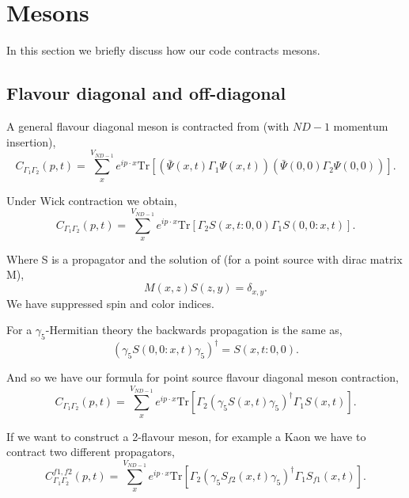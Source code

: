 \section{Mesons}

In this section we briefly discuss how our code contracts mesons.

\subsection{Flavour diagonal and off-diagonal}

A general flavour diagonal meson is contracted from (with $ND-1$ 
momentum insertion),
\begin{equation}
C_{\Gamma_1\Gamma_2}(p,t)=\sum_{x}^{V_{ND-1}}e^{ip\cdot x}\text{Tr}
\left[\left(\bar{\Psi}(x,t)\Gamma_1 \Psi(x,t)\right) 
\left(\bar{\Psi}(0,0)\Gamma_2 \Psi(0,0)\right)\right].
\end{equation}

Under Wick contraction we obtain,
\begin{equation}
C_{\Gamma_1\Gamma_2}(p,t)=\sum_{x}^{V_{ND-1}}e^{ip\cdot x}\text{Tr}
\left[\Gamma_2 S(x,t:0,0) \Gamma_1 S(0,0:x,t) \right].
\end{equation}

Where S is a propagator and the solution of (for a point source with dirac matrix M),
\begin{equation}
M(x,z)S(z,y) = \delta_{x,y}.
\end{equation}
We have suppressed spin and color indices.

For a $\gamma_5$-Hermitian theory the backwards propagation is the same as,
\begin{equation}
\left( \gamma_5 S(0,0:x,t) \gamma_5 \right)^{\dagger} = S(x,t:0,0).
\end{equation}

And so we have our formula for point source flavour diagonal 
meson contraction,
\begin{equation}
C_{\Gamma_1\Gamma_2}(p,t)=\sum_{x}^{V_{ND-1}}e^{ip\cdot x}\text{Tr}
\left[\Gamma_2 \left( \gamma_5 S(x,t) \gamma_5 \right)^{\dagger} \Gamma_1 S(x,t) \right].
\end{equation}

If we want to construct a 2-flavour meson, for example a Kaon
we have to contract two different propagators,
\begin{equation}
C_{\Gamma_1\Gamma_2}^{f1,f2}(p,t)=\sum_{x}^{V_{ND-1}}e^{ip\cdot x}\text{Tr}
\left[\Gamma_2 \left( \gamma_5 S_{f2}(x,t) \gamma_5 \right)^{\dagger} \Gamma_1 S_{f1}(x,t) \right].
\end{equation}

